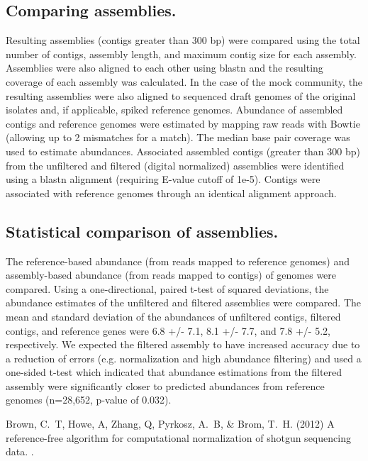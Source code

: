 \documentclass{pnastwo}
\begin{document}
\begin{article}
\subsection*{Comparing assemblies.}
Resulting assemblies (contigs greater than 300 bp) were compared using
the total number of contigs, assembly length, and maximum contig size
for each assembly.  Assemblies were also aligned to each other using
blastn and the resulting coverage of each assembly was calculated.  In
the case of the mock community, the resulting assemblies were also
aligned to sequenced draft genomes of the original isolates and, if
applicable, spiked reference genomes. Abundance of assembled contigs
and reference genomes were estimated by mapping raw reads with Bowtie
(allowing up to 2 mismatches for a match).  The median base pair
coverage was used to estimate abundances.  Associated assembled
contigs (greater than 300 bp) from the unfiltered and filtered
(digital normalized) assemblies were identified using a blastn
alignment (requiring E-value cutoff of 1e-5).  Contigs were associated
with reference genomes through an identical alignment approach.

\subsection*{Statistical comparison of assemblies.}
The reference-based abundance (from reads mapped to reference genomes)
and assembly-based abundance (from reads mapped to contigs) of genomes
were compared.  Using a one-directional, paired t-test of squared
deviations, the abundance estimates of the unfiltered and filtered
assemblies were compared.  The mean and standard deviation of 
the abundances of unfiltered contigs, filtered contigs, and reference genes
were 6.8 +/- 7.1, 8.1 +/- 7.7, and 7.8 +/- 5.2, respectively.  We expected the 
filtered assembly to have increased accuracy due to a reduction of errors (e.g. normalization
and high abundance filtering) and used a one-sided t-test which
indicated that abundance estimations from the filtered assembly were
significantly closer to predicted abundances from reference genomes
(n=28,652, p-value of 0.032).


\begin{thebibliography}{1}

Brown, C.~T, Howe, A, Zhang, Q, Pyrkosz, A.~B,  \& Brom, T.~H.
\newblock (2012) A reference-free algorithm for computational normalization of
  shotgun sequencing data.
.


\end{thebibliography}
\end{article}
\end{document}
